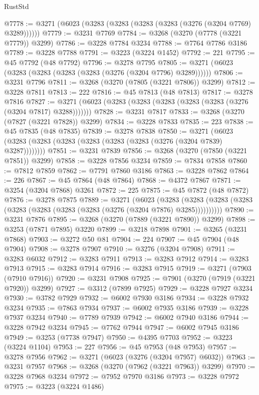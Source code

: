 \begin{lexlean}{RustStd}
\begin{coremodule}
@7778 := @3271 (@6023 (@3283 (@3283 (@3283 (@3283 (@3276 (@3204 @7769) @3289))))))
@7779 := @3231 @7769
@7784 := @3268 (@3270 (@7778 (@3221 @7779)) @3299)
@7786 := @3228 @7784 @3234
@7788 := @7764 @7786 @3186
@7789 := @3228 @7788
@7791 := @3223 (@3224 @1452)
@7792 := 221
@7795 := @45 @7792 (@48 @7792)
@7796 := @3278 @7795
@7805 := @3271 (@6023 (@3283 (@3283 (@3283 (@3283 (@3276 (@3204 @7796) @3289))))))
@7806 := @3231 @7796
@7811 := @3268 (@3270 (@7805 (@3221 @7806)) @3299)
@7812 := @3228 @7811
@7813 := 222
@7816 := @45 @7813 (@48 @7813)
@7817 := @3278 @7816
@7827 := @3271 (@6023 (@3283 (@3283 (@3283 (@3283 (@3283 (@3276 (@3204 @7817) @3288)))))))
@7828 := @3231 @7817
@7833 := @3268 (@3270 (@7827 (@3221 @7828)) @3299)
@7834 := @3228 @7833
@7835 := 223
@7838 := @45 @7835 (@48 @7835)
@7839 := @3278 @7838
@7850 := @3271 (@6023 (@3283 (@3283 (@3283 (@3283 (@3283 (@3283 (@3276 (@3204 @7839) @3287))))))))
@7851 := @3231 @7839
@7856 := @3268 (@3270 (@7850 (@3221 @7851)) @3299)
@7858 := @3228 @7856 @3234
@7859 := @7834 @7858
@7860 := @7812 @7859
@7862 := @7791 @7860 @3186
@7863 := @3228 @7862
@7864 := 226
@7867 := @45 @7864 (@48 @7864)
@7868 := @4372 @7867
@7871 := @3254 (@3204 @7868) @3261
@7872 := 225
@7875 := @45 @7872 (@48 @7872)
@7876 := @3278 @7875
@7889 := @3271
    (@6023
      (@3283 (@3283 (@3283 (@3283 (@3283 (@3283 (@3283 (@3283 (@3276 (@3204 @7876) @3285))))))))))
@7890 := @3231 @7876
@7895 := @3268 (@3270 (@7889 (@3221 @7890)) @3299)
@7898 := @3253 (@7871 @7895) @3220
@7899 := @3218 @7898
@7901 := @3265 (@3231 @7868)
@7903 := @3272 @50 @81
@7904 := 224
@7907 := @45 @7904 (@48 @7904)
@7908 := @3278 @7907
@7910 := @3276 (@3204 @7908)
@7911 := @3283 @6032
@7912 := @3283 @7911
@7913 := @3283 @7912
@7914 := @3283 @7913
@7915 := @3283 @7914
@7916 := @3283 @7915
@7919 := @3271 (@7903 (@7910 @7916))
@7920 := @3231 @7908
@7925 := @7901 (@3270 (@7919 (@3221 @7920)) @3299)
@7927 := @3312 (@7899 @7925)
@7929 := @3228 @7927 @3234
@7930 := @3782 @7929
@7932 := @6002 @7930 @3186
@7934 := @3228 @7932 @3234
@7935 := @7863 @7934
@7937 := @6002 @7935 @3186
@7939 := @3228 @7937 @3234
@7940 := @7789 @7939
@7942 := @6002 @7940 @3186
@7944 := @3228 @7942 @3234
@7945 := @7762 @7944
@7947 := @6002 @7945 @3186
@7949 := @3253 (@7738 @7947)
@7950 := @4395 @7703
@7952 := @3223 (@3224 @1104)
@7953 := 227
@7956 := @45 @7953 (@48 @7953)
@7957 := @3278 @7956
@7962 := @3271 (@6023 (@3276 (@3204 @7957) @6032))
@7963 := @3231 @7957
@7968 := @3268 (@3270 (@7962 (@3221 @7963)) @3299)
@7970 := @3228 @7968 @3234
@7972 := @7952 @7970 @3186
@7973 := @3228 @7972
@7975 := @3223 (@3224 @1486)

\end{coremodule}
\end{lexlean}
